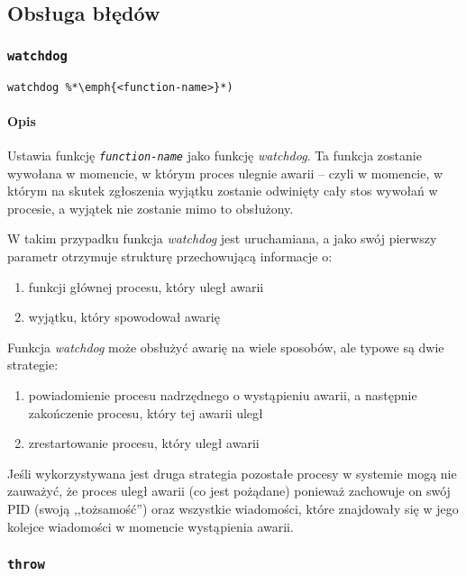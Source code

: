 \subsection{Obsługa błędów}
\label{viua_vm_ops_error_handling}

\subsubsection{\texttt{watchdog}}

\begin{lstlisting}
watchdog %*\emph{<function-name>}*)
\end{lstlisting}

\paragraph*{Opis} Ustawia funkcję \texttt{\emph{function-name}} jako funkcję
\emph{watchdog}. Ta funkcja zostanie wywołana w momencie, w którym proces
ulegnie awarii -- czyli w momencie, w którym na skutek zgłoszenia wyjątku
zostanie odwinięty cały stos wywołań w procesie, a wyjątek nie zostanie mimo
to obsłużony.

W takim przypadku funkcja \emph{watchdog} jest uruchamiana, a jako swój pierwszy
parametr otrzymuje strukturę przechowującą informacje o:
\begin{enumerate}
    \item funkcji głównej procesu, który uległ awarii
    \item wyjątku, który spowodował awarię
\end{enumerate}
Funkcja \emph{watchdog} może obsłużyć awarię na wiele sposobów, ale typowe są
dwie strategie:
\begin{enumerate}
    \item powiadomienie procesu nadrzędnego o wystąpieniu awarii, a następnie
        zakończenie procesu, który tej awarii uległ
    \item zrestartowanie procesu, który uległ awarii
\end{enumerate}
Jeśli wykorzystywana jest druga strategia pozostałe procesy w systemie mogą nie
zauważyć, że proces uległ awarii (co jest pożądane) ponieważ zachowuje on swój
PID (swoją ,,tożsamość'') oraz wszystkie wiadomości, które znajdowały się w jego
kolejce wiadomości w momencie wystąpienia awarii.

\subsubsection{\texttt{throw}}

